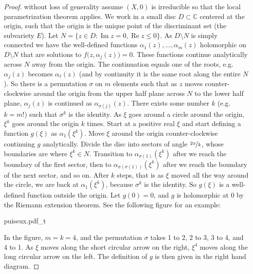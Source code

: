 \documentclass[12pt,openany]{book}
\renewcommand{\Re}{\operatorname{Re}}
\renewcommand{\Im}{\operatorname{Im}}
\newcommand{\C}{{\mathbb{C}}}
\theoremstyle{plain}
\theoremstyle{remark}
\theoremstyle{definition}
\theoremstyle{exercise}
\theoremstyle{example}
\begin{document}
\begin{proof}
without loss of generality
assume $(X,0)$
is irreducible so that
the local parametrization theorem applies.
We work in a small disc $D \subset \C$ centered at the origin, such that the
origin is the unique point of the discriminant set (the subvariety
$E$).  Let $N = \{ z \in D : \Im z = 0 , \Re z \leq 0 \}$.
As $D \setminus N$ is simply connected we have the well-defined functions
$\alpha_1(z),\ldots,\alpha_m(z)$ holomorphic on $D \setminus N$
that are solutions to $f\bigl(z,\alpha_j(z)\bigr) = 0$.
These functions continue analytically across $N$ away from the
origin.  The continuation equals one of the roots, e.g.\ $\alpha_j(z)$
becomes $\alpha_\ell(z)$ (and by continuity it is the
same root along the entire $N$).  So there is
a permutation $\sigma$ on $m$ elements such that as $z$ moves
counter-clockwise around the origin from the upper half plane across $N$ to the lower half
plane, $\alpha_j(z)$ is continued as $\alpha_{\sigma(j)}(z)$.
There exists some number $k$ (e.g.\ $k=m!$) such that $\sigma^k$ is the identity.
As $\xi$ goes around
a circle around the origin, $\xi^k$ goes around the origin $k$ times.
Start at a positive real $\xi$ and start defining a
function $g(\xi)$ as
$\alpha_1(\xi^k)$.
Move $\xi$ around the origin counter-clockwise continuing $g$ analytically.
Divide the disc into sectors of angle $\nicefrac{2\pi}{k}$,
whose boundaries are where $\xi^k \in N$.
Transition to $\alpha_{\sigma(1)}(\xi^k)$ after we reach the boundary
of the first sector, then to
$\alpha_{\sigma(\sigma(1))}(\xi^k)$ after we reach the boundary of the next sector, and so on.
After $k$ steps, that is as
$\xi$ moved all the way around the circle,
we are back at $\alpha_1(\xi^k)$,
because
$\sigma^k$ is the identity.
So $g(\xi)$ is a well-defined function outside the origin.  Let
$g(0) = 0$, and $g$ is holomorphic at 0 by the Riemann extension theorem.
See the following figure for an example:
\begin{center}
{puiseux.pdf_t}
\end{center}
In the figure, $m = k = 4$, and the permutation $\sigma$ takes 1 to 2, 2 to 3, 3 to 4,
and 4 to 1.  As $\xi$ moves along the short circular arrow on the right, $\xi^4$
moves along the long circular arrow on the left.  The definition of $g$ is
then given in the right hand diagram.
\end{proof}
\end{document}
